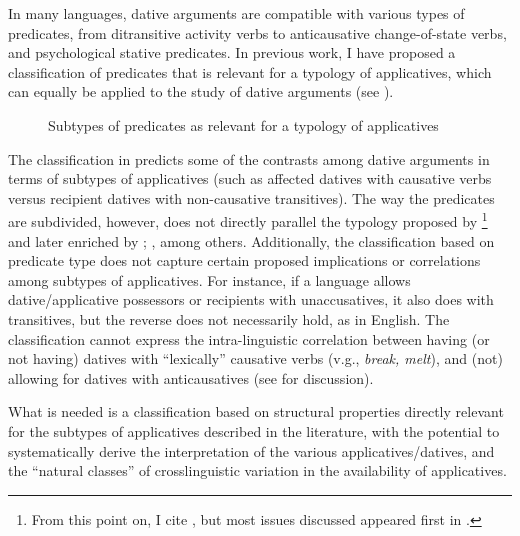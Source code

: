 \documentclass[output=paper,colorlinks,citecolor=brown,modfonts,nonflat]{langsci/langscibook}
\begin{document}
In many languages, dative arguments are compatible with various types of predicates, from ditransitive activity verbs to anticausative change-of-state verbs, and psychological stative predicates. In previous work, I have proposed a classification of predicates that is relevant for a typology of applicatives, which can equally be applied to the study of dative arguments (see ).

\begin{figure}
\caption{Subtypes of predicates as relevant for a typology of applicatives \citep[130]{Cuervo2015Chapter}}
\label{fig:cuervo:1}
\end{figure}

The classification in  predicts some of the contrasts among dative arguments in terms of subtypes of applicatives (such as affected datives with causative verbs versus recipient datives with non-causative transitives). The way the predicates are subdivided, however, does not directly parallel the typology proposed by \citet{Pylkkänen2002, Pylkkänen2008}\footnote{From this point on, I cite \citealt{Pylkkänen2008}, but most issues discussed appeared first in \citealt{Pylkkänen2002}.} and later enriched by \citealt{BonehNash2011WCCFL, Cuervo2003,Cuervo2010Probus,Kim2011high,McGinnis2001,McGinnis2008}; \citealt{McGinnisGerdts2004, RobergeTroberg2009}, among others. Additionally, the classification based on predicate type does not capture certain proposed implications or correlations among subtypes of applicatives. For instance, if a language allows dative/applicative possessors or recipients with unaccusatives, it also does with transitives, but the reverse does not necessarily hold, as in English. The classification cannot express the intra-linguistic correlation between having (or not having) datives with “lexically” causative verbs (v.g., \textit{break, melt}), and (not) allowing for datives with anticausatives (see \citealt{Peterson2007, Cuervo2015Chapter} for discussion).

What is needed is a classification based on structural properties directly relevant for the subtypes of applicatives described in the literature, with the potential to systematically derive the interpretation of the various applicatives/datives, and the “natural classes” of crosslinguistic variation in the availability of applicatives.
\end{document}
